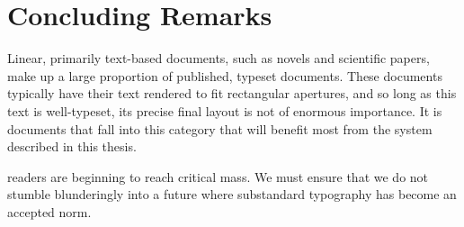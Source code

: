 \section{Concluding Remarks}

Linear, primarily text-based documents, such as novels and scientific papers, make up a large proportion of published, typeset documents. These documents typically have their text rendered to fit rectangular apertures, and so long as this text is well-typeset, its precise final layout is not of enormous importance. It is documents that fall into this category that will benefit most from the system described in this thesis.

\vspace{0.4in}

\noindent
\Ebook{} readers are beginning to reach critical mass. We must ensure that we do not stumble blunderingly into a future where substandard typography has become an accepted norm.


